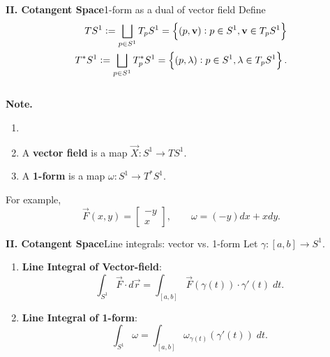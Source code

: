 \begin{frame}[fragile]{\textbf{II. Cotangent Space}}{1-form as a dual of vector field}
	Define \begin{align*}
		TS^1:=\bigsqcup_{p\in S^1}T_pS^1=\set{(p,\mathbf{v}):p\in S^1, \mathbf{v}\in T_pS^1}\\
		T^*S^1:=\bigsqcup_{p\in S^1}T_p^*S^1=\set{(p,\lambda):p\in S^1, \lambda\in T_pS^1}.
	\end{align*}\ \\
	\textbf{Note.}
	\begin{enumerate}[$\bullet$]
		\item[]
		\item  A \textbf{vector field} is a map $\vec{X}:S^1\to TS^1$.
		\item  A \textbf{1-form} is a map $\omega:S^1\to T^*S^1$.
	\end{enumerate}\vfill
For example, \[
\vec{F}(x,y)=\begin{bmatrix}
	-y \\ x
\end{bmatrix},\quad\quad \omega=(-y)dx+xdy.
\]
\end{frame}


\begin{frame}[fragile]{\textbf{II. Cotangent Space}}{Line integrals: vector vs. 1-form}
Let $\gamma:[a,b]\to S^1$.
\begin{enumerate}[$\bullet$]
	\item \textbf{Line Integral of Vector-field}: \[
	\int_{S^1}\vec{F}\cdot d\vec{r}=\int_{[a,b]}\vec{F}(\gamma(t))\cdot\gamma'(t)\; dt.
	\]
	\item \textbf{Line Integral of 1-form}: \[
	\int_{S^1}\omega=\int_{[a,b]}\omega_{\gamma(t)}(\gamma'(t))\; dt.
	\]
\end{enumerate}
\end{frame}
